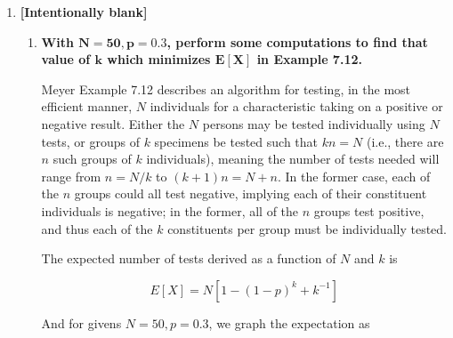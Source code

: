 \documentclass[10pt, oneside]{article}
\begin{document}
\begin{enumerate}[label=7.\arabic*]
\begin{enumerate}
\begin{enumerate}
		Therefore, the maximum expected daily profit is attained for $\boxed{K = 2}$.
		
		\end{enumerate}
	
	\end{enumerate}

\item  \begin{tcolorbox}[
  colback=Cerulean!5!white,
  colframe=Cerulean!75!black]
  \textbf{[Intentionally blank]}
\end{tcolorbox}

	\begin{enumerate}
	\item  \begin{tcolorbox}[
	  colback=Cerulean!5!white,
	  colframe=Cerulean!75!black]
	\textbf{With $\bm{N = 50, p = 0.3}$, perform some computations to find that value of $\bm{k}$ which minimizes $\bm{E[X]}$ in Example 7.12.}
	\end{tcolorbox}
	
	Meyer Example 7.12 describes an algorithm for testing, in the most efficient manner, $N$ individuals for a characteristic taking on a positive or negative result. Either the $N$ persons may be tested individually using $N$ tests, or groups of $k$ specimens be tested such that $kn = N$ (i.e., there are $n$ such groups of $k$ individuals), meaning the number of tests needed will range from $n = N/k$ to $(k + 1)n = N + n$. In the former case, each of the $n$ groups could all test negative, implying each of their constituent individuals is negative; in the former, all of the $n$ groups test positive, and thus each of the $k$ constituents per group must be individually tested.
	
	The expected number of tests derived as a function of $N$ and $k$ is
	
	\[ E[X] = N [1 - (1-p)^k + k^{-1}] \]
	
	And for givens $N = 50, p = 0.3$, we graph the expectation as
	

\end{enumerate}
\end{enumerate}
\end{document}
